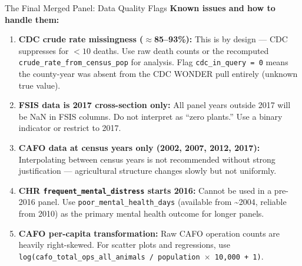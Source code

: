 \documentclass[aspectratio=169]{beamer}
\begin{document}
\begin{frame}{The Final Merged Panel: Data Quality Flags}
\textbf{Known issues and how to handle them:}

\vspace{0.5em}
\begin{enumerate}
    \item \textbf{CDC crude rate missingness ($\approx$85--93\%):} This is by design — CDC suppresses for $<10$ deaths. Use raw death counts or the recomputed \texttt{crude\_rate\_from\_census\_pop} for analysis. Flag \texttt{cdc\_in\_query = 0} means the county-year was absent from the CDC WONDER pull entirely (unknown true value).

    \item \textbf{FSIS data is 2017 cross-section only:} All panel years outside 2017 will be NaN in FSIS columns. Do not interpret as ``zero plants.'' Use a binary indicator or restrict to 2017.

    \item \textbf{CAFO data at census years only (2002, 2007, 2012, 2017):} Interpolating between census years is not recommended without strong justification — agricultural structure changes slowly but not uniformly.

    \item \textbf{CHR \texttt{frequent\_mental\_distress} starts 2016:} Cannot be used in a pre-2016 panel. Use \texttt{poor\_mental\_health\_days} (available from \textasciitilde 2004, reliable from 2010) as the primary mental health outcome for longer panels.

    \item \textbf{CAFO per-capita transformation:} Raw CAFO operation counts are heavily right-skewed. For scatter plots and regressions, use \texttt{log(cafo\_total\_ops\_all\_animals / population $\times$ 10{,}000 + 1)}.
\end{enumerate}
\end{frame}
\end{document}
